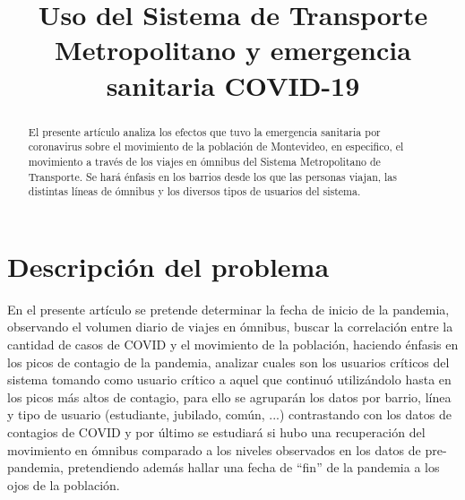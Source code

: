 \documentclass[conference]{IEEEtran}
\begin{document}
\title{Uso del Sistema de Transporte Metropolitano y emergencia sanitaria COVID-19\\
}

\author{
\and
{}
}

\maketitle

\begin{abstract}
El presente artículo analiza los efectos que tuvo la emergencia sanitaria por coronavirus sobre el movimiento de la población de Montevideo, en especifico, el movimiento a través de los viajes en ómnibus del Sistema Metropolitano de Transporte. Se hará énfasis en los barrios desde los que las personas viajan, las distintas líneas de ómnibus y los diversos tipos de usuarios del sistema.
\end{abstract}


\section{Descripción del problema}
En el presente artículo se pretende determinar la fecha de inicio de la pandemia, observando el volumen diario de viajes en ómnibus, buscar la correlación entre la cantidad de casos de COVID y el movimiento de la población, haciendo énfasis en los picos de contagio de la pandemia, analizar cuales son los usuarios críticos del sistema tomando como usuario crítico a aquel que continuó utilizándolo hasta en los picos más altos de contagio, para ello se agruparán los datos por barrio, línea y tipo de usuario (estudiante, jubilado, común, ...) contrastando con los datos de contagios de COVID y por último se estudiará si hubo una recuperación del movimiento en ómnibus comparado a los niveles observados en los datos de pre-pandemia, pretendiendo además hallar una fecha de “fin” de la pandemia a los ojos de la población.
\end{document}
